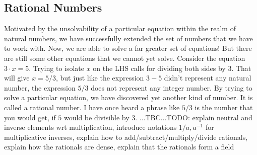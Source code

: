 \subsection{Rational Numbers}
Motivated by the unsolvability of a particular equation within the realm of natural numbers, we have successfully extended the set of numbers that we have to work with. Now, we are able to solve a far greater set of equations! But there are still some other equations that we cannot yet solve. Consider the equation $3 \cdot x = 5$. Trying to isolate $x$ on the LHS calls for dividing both sides by 3. That will give $x = 5/3$, but just like the expression $3-5$ didn't represent any natural number, the expression $5/3$ does not represent any integer number. By trying to solve a particular equation, we have discovered yet another kind of number. It is called a rational number. I have once heard a phrase like $5/3$ is the number that you would get, if $5$ would be divisible by $3$. ...TBC...TODO: explain neutral and inverse elements wrt multiplication, introduce notations $1/a, a^{-1}$ for multiplicative inverses, explain how to add/subtract/multiply/divide rationals, explain how the rationals are dense, explain that the rationals form a field







